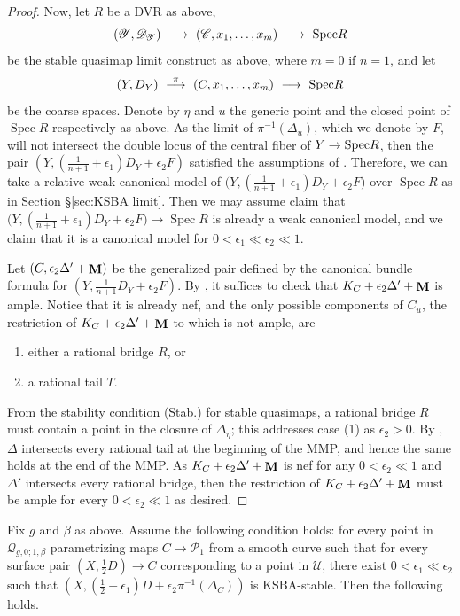 \documentclass[a4paper,12pt]{amsart}
\newcommand{\cQ}{\mathcal{Q}}
\DeclareMathOperator{\Spec}{Spec}
\newcommand{\sY}{{\mathscr{Y}}}
\newcommand{\sP}{{\mathscr{P}}}
\newcommand{\sD}{{\mathscr{D}}}
\newcommand{\sC}{{\mathscr{C}}}
\newcommand{\cU}{{\mathcal{U}}}
\DeclareMathOperator{\bfM}{{\bf{M}}}
\newcommand\spec{\text{\rm Spec}}
\theoremstyle{definition}
\theoremstyle{remark}
\begin{document}
\begin{proof}
Now, let $R$ be a DVR as above, \[\textstyle \left(\sY,\sD_\sY\right) \ \longrightarrow \ (\sC,x_1,\ldots,x_m)\ \longrightarrow \ \spec R \] be the stable quasimap limit construct as above, where $m=0$ if $n=1$, and let \[\textstyle \left(Y,D_Y\right)\ \stackrel{\pi}{\longrightarrow} \ (C,x_1,\ldots,x_m)\ \longrightarrow \ \spec R\] be the coarse spaces. Denote by $\eta$ and $u$ the generic point and the closed point of $\Spec R$ respectively as above. As the limit of $\pi^{-1}(\Delta_{u})$, which we denote by $F$, will not intersect the double locus
of the central fiber of $Y\to \spec R $, then the pair $(Y,(\frac{1}{n+1}+\epsilon_1)D_Y+\epsilon_2 F)$ satisfied the assumptions of . Therefore, we can take a relative weak canonical model of $\big(Y,(\frac{1}{n+1}+\epsilon_1)D_Y+\epsilon_2 F\big)$ over $\Spec R$ as in Section \S\ref{sec:KSBA limit}. Then we may assume claim that $\big(Y,(\frac{1}{n+1}+\epsilon_1)D_Y+\epsilon_2 F\big)\rightarrow \Spec R$ is already a weak canonical model, and we claim that it is a canonical model for $0<\epsilon_1\ll\epsilon_2\ll 1$.

Let $(C,\epsilon_2\Delta'+\bfM)$ be the generalized pair defined by the canonical bundle formula for $(Y,\frac{1}{n+1}D_Y+\epsilon_2 F)$. By , it suffices to check that $K_{C}+\epsilon_2\Delta'+\bfM$ is ample. Notice that it is already nef, and the only possible components of $C_u$, the restriction of $K_{C}+\epsilon_2\Delta'+\bfM$ to which is not ample, are 
\begin{enumerate}
    \item either a rational bridge $R$, or
    \item a rational tail $T$.
\end{enumerate}
From the stability condition (Stab.) for stable quasimaps, a rational bridge $R$ must contain a point in the closure of $\Delta_\eta$; this addresses case (1) as $\epsilon_2>0$. By , $\Delta$ intersects every rational tail at the beginning of the MMP, and hence the same holds at the end of the MMP. As $K_{C}+\epsilon_2\Delta'+\bfM$ is nef for any $0<\epsilon_2\ll 1$ and $\Delta'$ intersects every rational bridge, then the restriction of $K_{C}+\epsilon_2\Delta'+\bfM$ must be ample for every $0<\epsilon_2\ll 1$ as desired.
 \end{proof}
 

Fix $g$ and $\beta$ as above. Assume the following condition holds: for every point in $\cQ_{g,0;1,\beta}$ parametrizing maps $C\to \sP_1$ from a smooth curve such that for every surface pair $(X,\frac{1}{2}D)\to C$ corresponding to a point in $\cU$, there exist $0<\epsilon_1\ll \epsilon_2$ such that $(X,(\frac{1}{2}+\epsilon_1)D+\epsilon_2 \pi^{-1}(\Delta_C))$ is KSBA-stable. Then the following holds.
\end{document}

